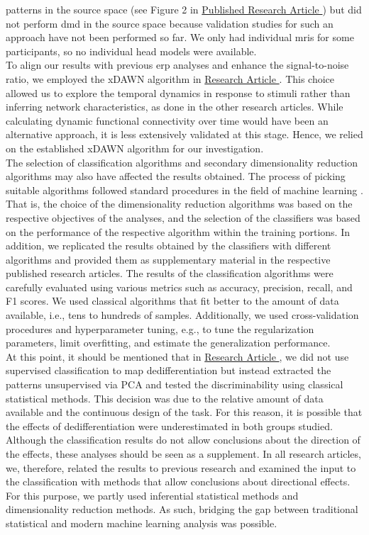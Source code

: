 patterns in the source space (see Figure 2 in \hyperref[pub:paperIII]{Published Research Article }) but did not perform \gls{dmd} in the source space because validation studies for such an approach have not been performed so far. We only had individual \glspl{mri} for some participants, so no individual head models were available.\\
To align our results with previous \gls{erp} analyses and enhance the signal-to-noise ratio, we employed the xDAWN algorithm in \hyperref[results:paperIV]{Research Article }. This choice allowed us to explore the temporal dynamics in response to stimuli rather than inferring network characteristics, as done in the other research articles. While calculating dynamic functional connectivity over time would have been an alternative approach, it is less extensively validated at this stage. Hence, we relied on the established xDAWN algorithm for our investigation.\\
The selection of classification algorithms and secondary dimensionality reduction algorithms may also have affected the results obtained. The process of picking suitable algorithms followed standard procedures in the field of machine learning \cite{Shalev2014}. That is, the choice of the dimensionality reduction algorithms was based on the respective objectives of the analyses, and the selection of the classifiers was based on the performance of the respective algorithm within the training portions. In addition, we replicated the results obtained by the classifiers with different algorithms and provided them as supplementary material in the respective published research articles. The results of the classification algorithms were carefully evaluated using various metrics such as accuracy, precision, recall, and F1 scores. We used classical algorithms that fit better to the amount of data available, i.e., tens to hundreds of samples. Additionally, we used cross-validation procedures and hyperparameter tuning, e.g., to tune the regularization parameters, limit overfitting, and estimate the generalization performance.\\
At this point, it should be mentioned that in \hyperref[results:paperIII]{Research Article }, we did not use supervised classification to map dedifferentiation but instead extracted the patterns unsupervised via PCA and tested the discriminability using classical statistical methods. This decision was due to the relative amount of data available and the continuous design of the task. For this reason, it is possible that the effects of dedifferentiation were underestimated in both groups studied.\\
Although the classification results do not allow conclusions about the direction of the effects, these analyses should be seen as a supplement. In all research articles, we, therefore, related the results to previous research and examined the input to the classification with methods that allow conclusions about directional effects. For this purpose, we partly used inferential statistical methods and dimensionality reduction methods. As such, bridging the gap between traditional statistical and modern machine learning analysis was possible.

